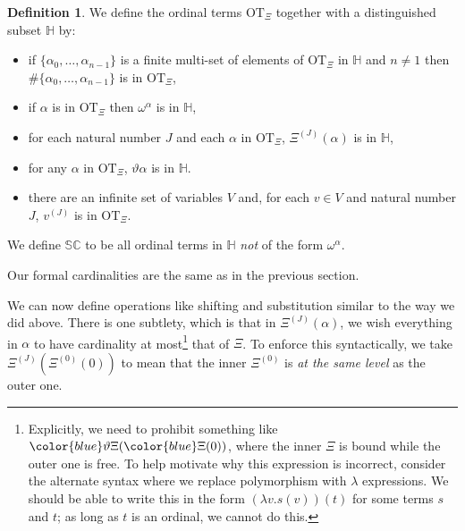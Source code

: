 \documentclass[11pt]{amsart}
\theoremstyle{definition}
\newtheorem{definition}[theorem]{Definition}
\begin{document}
\begin{definition}
  We define the ordinal terms $\mathrm{OT}_{\Xi}$ together with a distinguished subset $\mathbb{H}$ by:
  \begin{itemize}
  \item if $\{\alpha_0,\ldots,\alpha_{n-1}\}$ is a finite multi-set of elements of $\mathrm{OT}_{\Xi}$ in $\mathbb{H}$ and $n\neq 1$ then $\#\{\alpha_0,\ldots,\alpha_{n-1}\}$ is in $\mathrm{OT}_{\Xi}$,
  \item if $\alpha$ is in $\mathrm{OT}_{\Xi}$ then $\omega^\alpha$ is in $\mathbb{H}$,
  \item for each natural number $J$ and each $\alpha$ in $\mathrm{OT}_{\Xi}$, $\Xi^{(J)}(\alpha)$ is in $\mathbb{H}$,
  \item for any $\alpha$ in $\mathrm{OT}_{\Xi}$, $\vartheta\alpha$ is in $\mathbb{H}$.
  \item there are an infinite set of variables $V$ and, for each $v\in V$ and natural number $J$, $v^{(J)}$ is in $\mathrm{OT}_\Xi$.
  \end{itemize}

  We define $\mathbb{SC}$ to be all ordinal terms in $\mathbb{H}$ \emph{not} of the form $\omega^\alpha$.
\end{definition}

Our formal cardinalities are the same as in the previous section.

We can now define operations like shifting and substitution similar to the way we did above. There is one subtlety, which is that in $\Xi^{(J)}(\alpha)$, we wish everything in $\alpha$ to have cardinality at most\footnote{Explicitly, we need to prohibit something like ${\color{blue}\vartheta}\Xi({\color{blue}\Xi}(0))$, where the inner $\Xi$ is bound while the outer one is free. To help motivate why this expression is incorrect, consider the alternate syntax where we replace polymorphism with $\lambda$ expressions. We should be able to write this in the form $(\lambda v. s(v))(t)$ for some terms $s$ and $t$; as long as $t$ is an ordinal, we cannot do this.} that of $\Xi$. To enforce this syntactically, we take $\Xi^{(J)}(\Xi^{(0)}(0))$ to mean that the inner $\Xi^{(0)}$ is \emph{at the same level} as the outer one.
\end{document}
